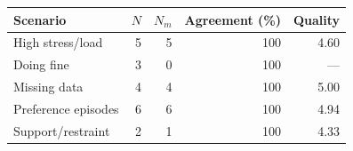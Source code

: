\begin{tabular}{lrrrr}
\toprule
Scenario & $N$ & $N_m$ & Agreement (\%) & Quality \\
\midrule
High stress/load & 5 & 5 & 100 & 4.60 \\
Doing fine & 3 & 0 & 100 & --- \\
Missing data & 4 & 4 & 100 & 5.00 \\
Preference episodes & 6 & 6 & 100 & 4.94 \\
Support/restraint & 2 & 1 & 100 & 4.33 \\
\bottomrule
\end{tabular}
